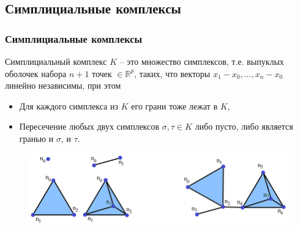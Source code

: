 \documentclass{beamer}
\begin{document}
		\subsection{Симплициальные комплексы}
		\begin{frame}
			\frametitle{Симплициальные комплексы}
			
			\begin{definition}
				Симплициальный комплекс $K$ -- это множество симплексов, т.е. выпуклых оболочек набора $n+1$ точек $\in \mathbb{R}^p$, таких, что векторы $ x_1 - x_0, ..., x_n - x_0 $ линейно независимы, при этом
				\begin{itemize}
					\setlength{\itemsep}{-1mm}
					\item Для каждого симплекса из $K$ его грани тоже лежат в $K$,
					\item Пересечение любых двух симплексов $\sigma, \tau \in K$ либо пусто, либо является гранью и $\sigma$, и $\tau$.
				\end{itemize}
			\end{definition}
			\begin{figure}
				\centering
				\includegraphics[width=\linewidth]{simplexAndComplex.png}
			\end{figure}
		\end{frame}
\end{document}
